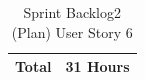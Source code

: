 \documentclass[12pt]{report}
\begin{document}
\begin{table}[h]
{\begin{tabular}{|cc|cccccccc|}
\multicolumn{2}{|c|}{\textbf{Total}}                                                                                                                                                  & \multicolumn{8}{c|}{31   Hours}                                                                                                                                                                                                                                                                                                                                                                                                                                                                                                                                                                                                                                                                                                                                                                                                                                                                                            \\ \hline
\end{tabular}
}
\caption{Sprint Backlog2 (Plan) User Story 6}
\label{tab:mytable}
\end{table}
\end{document}
